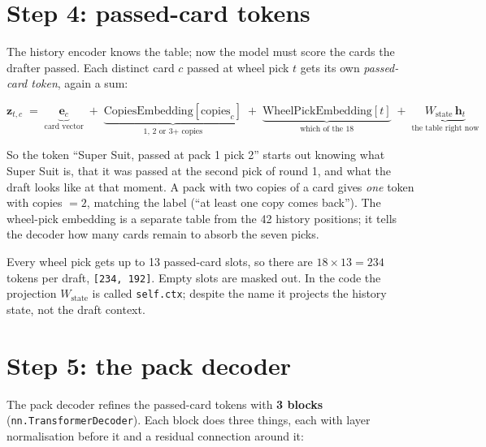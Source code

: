 \documentclass[11pt,letterpaper]{article}
\newcommand{\code}[1]{\texttt{\small #1}}
\newcommand{\shape}[1]{\texttt{\footnotesize[#1]}}
\begin{document}
\section{Step 4: passed-card tokens}

The history encoder knows the table; now the model must score the cards the drafter passed. Each distinct
card $c$ passed at wheel pick $t$ gets its own \emph{passed-card token}, again a sum:

\[
\mathbf{z}_{t,c} \;=\; \underbrace{\mathbf{e}_c}_{\text{card vector}}
\;+\; \underbrace{\text{CopiesEmbedding}[\text{copies}_c]}_{\text{1, 2 or 3+ copies}}
\;+\; \underbrace{\text{WheelPickEmbedding}[t]}_{\text{which of the 18}}
\;+\; \underbrace{W_{\text{state}}\,\mathbf{h}_t}_{\text{the table right now}}
\]

So the token ``Super Suit, passed at pack 1 pick 2'' starts out knowing what Super Suit is, that it was passed
at the second pick of round 1, and what the draft looks like at that moment. A pack with two copies of a card
gives \emph{one} token with copies $=2$, matching the label (``at least one copy comes back''). The wheel-pick
embedding is a separate table from the 42 history positions; it tells the decoder how many cards remain to
absorb the seven picks.

Every wheel pick gets up to 13 passed-card slots, so there are $18\times13=234$ tokens per draft,
\shape{234, 192}. Empty slots are masked out. In the code the projection $W_{\text{state}}$ is called
\code{self.ctx}; despite the name it projects the history state, not the draft context.

\section{Step 5: the pack decoder}\label{sec:decoder}

The pack decoder refines the passed-card tokens with \textbf{3 blocks} (\code{nn.TransformerDecoder}). Each
block does three things, each with layer normalisation before it and a residual connection around it:
\end{document}
